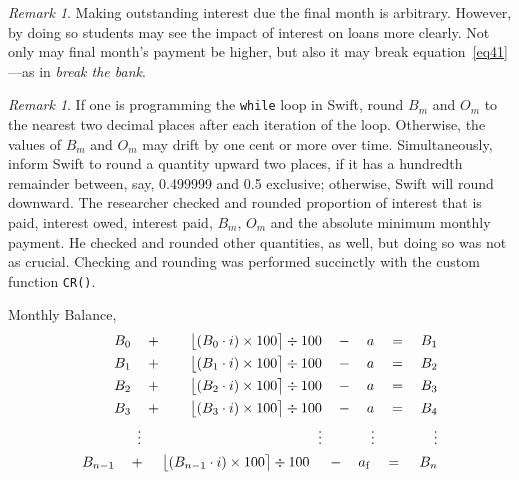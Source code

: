 \documentclass[12pt,letterpaper,oneside]{article}
\theoremstyle{remark} %
\newtheorem{remark}[theorem]{Remark}
\begin{document}
	\begin{remark}
	Making outstanding interest due the final month is arbitrary. However, by doing so students may see the impact of interest on loans more clearly. Not only may final month's payment be higher, but also it may break equation~\ref{eq41}---as in \textit{break the bank}. 
	\end{remark}

	\vspace{12pt}
	\begin{remark}
	If one is programming the \texttt{while} loop in Swift, round $B_{m}$ and $O_{m}$ to the nearest two decimal places after each iteration of the loop. Otherwise, the values of $B_{m}$ and $O_{m}$ may drift by one cent or more over time. Simultaneously, inform Swift to round a quantity upward two places, if it has a hundredth remainder between, say, 0.499999 and 0.5 exclusive; otherwise, Swift will round downward. The researcher checked and rounded proportion of interest that is paid, interest owed, interest paid, $B_{m}$, $O_{m}$ and the absolute minimum monthly payment. He checked and rounded other quantities, as well, but doing so was not as crucial. Checking and rounding was performed succinctly with the custom function \texttt{CR()}.
	\end{remark}

	\vspace{12pt}
	Monthly Balance,
	\small
	\begin{align}\label{eq41}
	B_{0}\quad +\qquad\big\lfloor{\left(B_{0}\cdot i\right)\times 100}\big\rceil\div 100\quad -\quad a\quad =\quad B_{1}\nonumber\\
	B_{1}\quad +\qquad\big\lfloor{\left(B_{1}\cdot i\right)\times 100}\big\rceil\div 100\quad -\quad a\quad =\quad B_{2}\nonumber\\
	B_{2}\quad +\qquad\big\lfloor{\left(B_{2}\cdot i\right)\times 100}\big\rceil\div 100\quad -\quad a\quad =\quad B_{3}\nonumber\\
	B_{3}\quad +\qquad\big\lfloor{\left(B_{3}\cdot i\right)\times 100}\big\rceil\div 100\quad -\quad a\quad =\quad B_{4}\nonumber\\
	\vdots\qquad\qquad\qquad\qquad\qquad\qquad\ \ \vdots\qquad\quad\,\ \vdots\qquad\quad\ \ \ \:\vdots\nonumber\\
	B_{n-1}\quad +\quad\,\big\lfloor{\left(B_{n-1}\cdot i\right)\times 100}\big\rceil\div 100\ \ \ \;-\ \ \ a_{\rm{f}}\quad =\ \ \ \,B_{n}
	\end{align}
	
\end{document}
